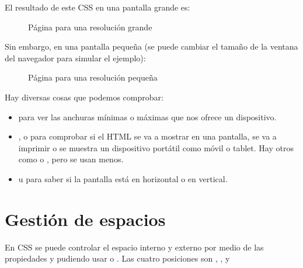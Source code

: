 \documentclass[letterpaper,10pt,spanish]{sphinxmanual}
\begin{document}
El resultado de este CSS en una pantalla grande es:

\begin{figure}[htbp]
\centering
\capstart

\noindent{}
\caption{Página para una resolución grande}\label{\detokenize{tema3:id14}}\end{figure}

Sin embargo, en una pantalla pequeña (se puede cambiar el tamaño de la ventana del navegador para simular el ejemplo):

\begin{figure}[htbp]
\centering
\capstart

\noindent{}
\caption{Página para una resolución pequeña}\label{\detokenize{tema3:id15}}\end{figure}

Hay diversas cosas que podemos comprobar:
\begin{itemize}
\item {} 
 para ver las anchuras mínimas o máximas que nos ofrece un dispositivo.

\item {} 
 ,  o  para comprobar si el HTML se va a mostrar en una pantalla, se va a imprimir o se muestra un dispositivo portátil como móvil o tablet. Hay otros  como  o , pero se usan menos.

\item {} 
 u  para saber si la pantalla está en horizontal o en vertical.

\end{itemize}


\section{Gestión de espacios}
\label{\detokenize{tema3:gestion-de-espacios}}
En CSS se puede controlar el espacio interno y externo por medio de las propiedades  y  pudiendo usar  o . Las cuatro posiciones son , ,  y 
\end{document}
